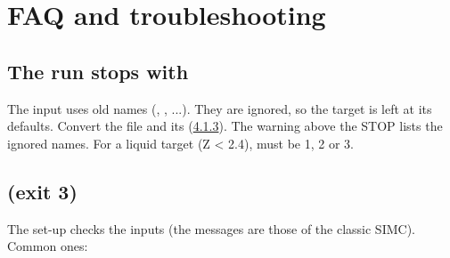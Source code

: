 \chapter{\texorpdfstring{FAQ and troubleshooting}{FAQ and troubleshooting}}\label{user_manual-10u5ffaq}
\section*{\texorpdfstring{The run stops with }{The run stops with bad targ.can value}}\label{user_manual-10u5ffaq:the-run-stops-with-bad-targcan-value}
The input uses old  names (, , ...). They are ignored, so the target is left at its defaults.
Convert the file and its \hyperref[param:extrau5fdbaseu5ffile]{} (\hyperref[user_manual-04u5finputs:413-old--names]{4.1.3}). The warning above the STOP lists the ignored names.
For a liquid target (Z < 2.4), \hyperref[param:targu25can]{} must be 1, 2 or 3.

\section*{\texorpdfstring{ (exit 3)}{simc++: STOP during setup (legacy SIMC behaviour): STOP ... (exit 3)}}\label{user_manual-10u5ffaq:simc-stop-during-setup-legacy-simc-behaviour-stop--exit-3}
The set-up checks the inputs (the messages are those of the classic SIMC). Common ones:

